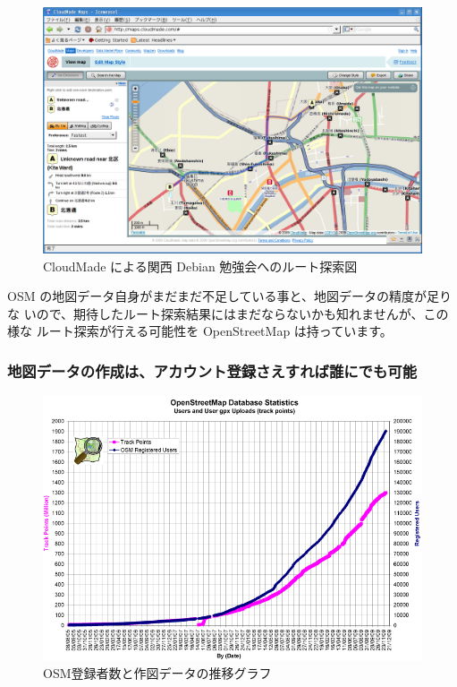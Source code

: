 \documentclass[mingoth,a4paper]{jsarticle}
\begin{document}
\begin{figure}[h]
 \centering
 \includegraphics[scale=0.4]{image200912/debianosm2.png}
 \caption{CloudMade による関西 Debian 勉強会へのルート探索図}
 \label{fig:debianosm2}
\end{figure}

OSM の地図データ自身がまだまだ不足している事と、地図データの精度が足りな
いので、期待したルート探索結果にはまだならないかも知れませんが、この様な
ルート探索が行える可能性を OpenStreetMap は持っています。

\subsubsection{地図データの作成は、アカウント登録さえすれば誰にでも可能}

\begin{figure}
 \includegraphics[scale=0.5]{image200912/debianosm3.png}
 \caption{OSM登録者数と作図データの推移グラフ}
\end{figure}
\end{document}
